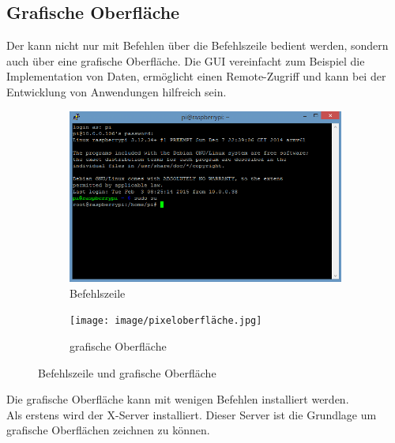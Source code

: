 \subsection{Grafische Oberfläche \raspi}\label{sec:Grafische Oberfläche}
Der \raspi kann nicht nur mit Befehlen über die Befehlszeile bedient werden, sondern auch über eine grafische Oberfläche. Die GUI vereinfacht zum Beispiel die Implementation von Daten, ermöglicht einen Remote-Zugriff und kann bei der Entwicklung von Anwendungen hilfreich sein.\\
\vspace{3mm}
\begin{figure}[htbp]
    \centering
    \begin{subfigure}[b]{0.45\textwidth}
        \centering
        \includegraphics[width=\textwidth]{image/terminal.png}
        \caption{Befehlszeile}
        \label{fig:bild1}
    \end{subfigure}
    \hfill
    \begin{subfigure}[b]{0.5\textwidth}
        \centering
        \texttt{[image: image/pixeloberfläche.jpg]}
        \caption{grafische Oberfläche}
        \label{fig:bild2}
    \end{subfigure}
    \caption{Befehlszeile\autocite{Befehlszeile} und grafische Oberfläche\autocite{Grafische-Oberfläche}}
    \label{fig:zwei_bilder}
\end{figure}
\vspace{3mm}
Die grafische Oberfläche kann mit wenigen Befehlen installiert werden. \\
Als erstens wird der X-Server installiert. Dieser Server ist die Grundlage um grafische Oberflächen zeichnen zu können.\\
\vspace{3mm}
